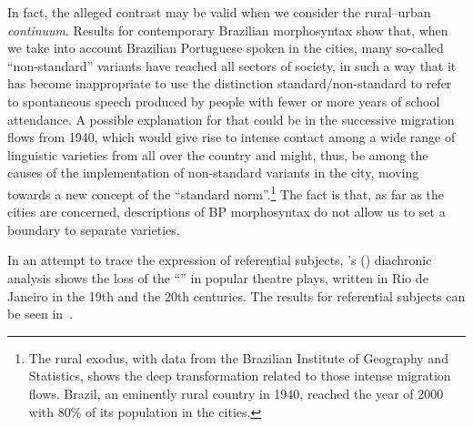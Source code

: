 \documentclass[output=paper]{langsci/langscibook}
\begin{document}
In fact, the alleged contrast may be valid when we consider the rural--urban
\emph{continuum}. Results for contemporary Brazilian morphosyntax show that,
when we take into account Brazilian Portuguese spoken in the cities, many
so-called “non-standard” variants have reached all sectors of society, in such
a way that it has become inappropriate to use the distinction
standard/non-standard to refer to spontaneous speech produced by people with
fewer or more years of school attendance. A possible explanation for that could
be in the successive migration flows from 1940, which would give rise to
intense contact among a wide range of linguistic varieties from all over the
country and might, thus, be among the causes of the implementation of
non-standard variants in the city, moving towards a new concept of the
“standard norm”.\footnote{The rural exodus, with data from the Brazilian
    Institute of Geography and Statistics, shows the deep transformation
related to those intense migration flows. Brazil, an eminently rural country in
1940, reached the year of 2000 with 80\% of its population in the cities.}  The
fact is that, as far as the cities are concerned, descriptions of
\gls{BP} morphosyntax do not allow us to set a
boundary to separate varieties.

In an attempt to trace the expression of referential subjects,
\citeauthor{Duarte1993}’s (\citeyear{Duarte1993,Duarte2012}) diachronic
analysis shows the loss of the “” \citep{Chomsky1981} in
popular theatre plays, written in Rio de Janeiro in the 19th and the 20th
centuries. The results for referential subjects can be seen
in~.

\end{document}
